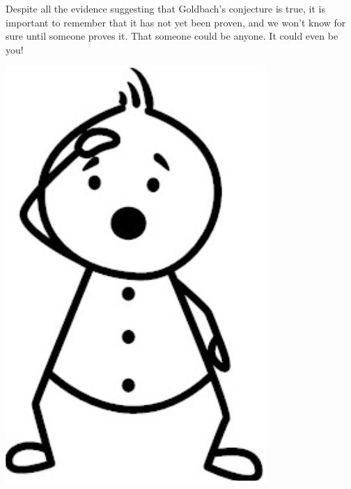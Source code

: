 \documentclass{article}
\begin{document}
Despite all the evidence suggesting that Goldbach’s conjecture is true, it is important to remember that it has not yet been proven, and we won’t know for sure until someone proves it. That someone could be anyone. It could even be you!
\begin{center}
    \includegraphics[scale=0.3]{images/stick_figure1.png}
\end{center}
\end{document}
